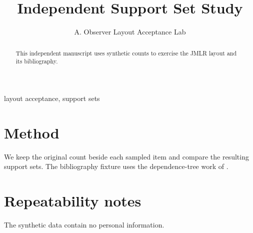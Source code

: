 \documentclass[twoside,11pt]{article}
\begin{document}
\title{Independent Support Set Study}
\author{\name A. Observer \addr Layout Acceptance Lab}
\maketitle

\begin{abstract}%
This independent manuscript uses synthetic counts to exercise the JMLR layout and its bibliography.
\end{abstract}
\begin{keywords}
layout acceptance, support sets
\end{keywords}

\section{Method}
We keep the original count beside each sampled item and compare the resulting support sets.
The bibliography fixture uses the dependence-tree work of \citet{chow:68}.

\appendix
\section{Repeatability notes}
The synthetic data contain no personal information.


\end{document}
